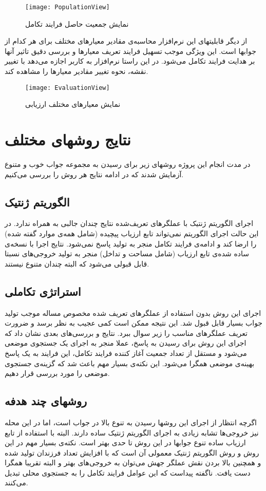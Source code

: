 \documentclass{report}
\begin{document}
\begin{figure}[h] \centerline{\texttt{[image: PopulationView]}} \caption{\label{fPopulationView}
نمایش جمعیت حاصل فرایند تکامل
 } \end{figure}
 
 از دیگر قابلیتهای این نرم‌افزار محاسبه‌ی مقادیر معیارهای مختلف برای هر کدام از جوابها است. این ویژگی موجب تسهیل فرایند تعریف معیارها و بررسی دقیق تاثیر آنها بر هدایت فرایند تکامل می‌شود. در این راستا نرم‌افزار به کاربر اجازه می‌دهد با تغییر نقشه، نحوه تغییر مقادیر معیارها را مشاهده کند.
 
 \begin{figure}[h] \centerline{\texttt{[image: EvaluationView]}} \caption{\label{fEvaluationView}
نمایش معیارهای مختلف ارزیابی
 } \end{figure}

\section{نتایج روشهای مختلف}
در مدت انجام این پروژه روشهای زیر برای رسیدن به مجموعه جواب خوب و متنوع آزمایش شدند که در ادامه نتایج هر روش را بررسی می‌کنیم.

\subsection{الگوریتم ژنتیک}
اجرای الگوریتم ژنتیک با عملگرهای تعریف‌شده نتایج چندان جالبی به همراه ندارد. در این حالت اجرای الگوریتم نمی‌تواند تابع ارزیاب پیچیده (شامل همه‌ی موارد گفته شده) را ارضا کند و ادامه‌ی فرایند تکامل منجر به تولید پاسخ نمی‌شود. نتایج اجرا با نسخه‌ی ساده شده‌ی تابع ارزیاب (شامل مساحت و تداخل) منجر به تولید خروجی‌های نسبتا قابل قبولی می‌شود که البته چندان متنوع نیستند.

\subsection{استراتژی تکاملی}
اجرای این روش بدون استفاده از عملگرهای تعریف شده مخصوص مساله موجب تولید جواب بسیار قابل قبول شد. این نتیجه ممکن است کمی عجیب به نظر برسد و ضرورت تعریف عملگرهای مناسب را زیر سوال ببرد. نتایج و بررسی‌های بعدی نشان داد که اجرای این روش برای رسیدن به پاسخ، عملا منجر به اجرای یک جستجوی موضعی می‌شود و مستقل از تعداد جمعیت آغاز کننده فرایند تکامل، این فرایند به یک پاسخ بهینه‌ی موضعی همگرا می‌شود. این نکته‌ی بسیار مهم باعث شد که گزینه‌ی جستجوی موضعی را مورد بررسی قرار دهیم.

\subsection{روشهای چند هدفه}
اگرچه انتظار از اجرای این روشها رسیدن به تنوع بالا در جواب است، اما در این محله نیز خروجی‌ها تشابه زیادی به اجرای الگوریتم ژنتیک ساده دارند. البته با استفاده از تابع ارزیاب ساده تنوع جوابها در این روش تا حدی بهتر است.
نکته‌ی بسیار مهم در این روش و روش الگوریتم ژنتیک معمولی آن است که با افزایش تعداد فرزندان تولید شده و همچنین بالا بردن نقش عملگر جهش می‌توان به خروجی‌های بهتر و البته تقریبا همگرا دست یافت. ناگفته پیداست که این عوامل فرایند تکامل را به جستجوی محلی تبدیل می‌کنند.
\end{document}
